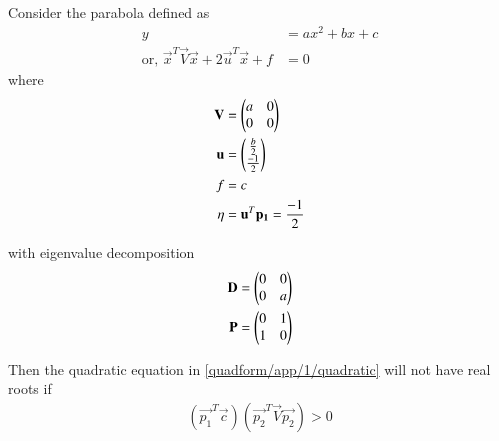 \begin{lemma}
    Consider the parabola defined as
    \begin{align}
        \label{quadform/app/1/quadratic}
        y &= ax^2+bx+c 
\\
  \text{or, }  \vec{x}^T\vec{V}\vec{x} + 2\vec{u}^T\vec{x} + f &= 0
\end{align}
%
where
\begin{align}
    \mathbf{V} &= \begin{pmatrix}a & 0 \\ 0 & 0\end{pmatrix}
    \\
    \mathbf{u} &= \begin{pmatrix}\frac{b}{2} \\ \frac{-1}{2}\end{pmatrix}
    \\
    f &= c
\\
        \eta &= \mathbf{u}^T\mathbf{p_1} = \frac{-1}{2}
    \end{align}
    

%
with  eigenvalue decomposition
\begin{align}
    \mathbf{D} &= \begin{pmatrix}0 & 0 \\ 0 & a\end{pmatrix} \\
    \mathbf{P} &= \begin{pmatrix}0 & 1 \\ 1 & 0\end{pmatrix}
\end{align}

Then the quadratic equation in         \eqref{quadform/app/1/quadratic} will not have real roots if 
\begin{align}
    \label{quadform/app/1/imag}
    \boxed{(\vec{p_1}^T\vec{c})(\vec{p_2}^T\vec{V}\vec{p_2}) > 0}
\end{align}
    
\end{lemma}

